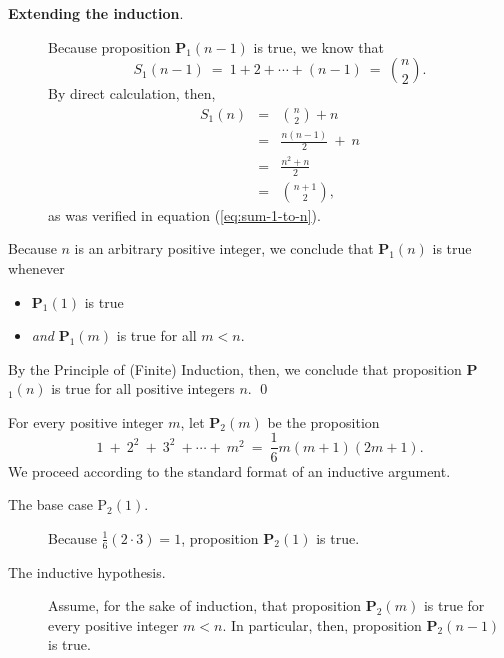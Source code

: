 {\begin{description}
\item[{\bf Extending the induction}.]
%
Because proposition {\bf P}$_1(n-1)$ is true, we know that
\[ S_1(n-1) \ = \ 1 + 2 + \cdots + (n-1) \ = \ {n \choose 2}.  \]
By direct calculation, then,
\begin{eqnarray*}
S_1(n) & = & {n \choose 2} + n \\
  & = & \frac{n(n-1)}{2}  \ + \ n \\ 
  & = & \frac{n^2 + n}{2} \\
  & = & {{n+1} \choose 2},
\end{eqnarray*}
as was verified in equation (\ref{eq:sum-1-to-n}).
\end{description}
Because $n$ is an arbitrary positive integer, we conclude that
{\bf P}$_1(n)$ is true whenever
\begin{itemize}
\item
{\bf P}$_1(1)$ is true
\item
{\em and}
{\bf P}$_1(m)$ is true for all $m < n$.
\end{itemize}
By the Principle of (Finite) Induction, then, we conclude that
proposition {\bf P}$_1(n)$ is true for all positive integers $n$.
\qed

\bigskip


%
For every positive integer $m$, let {\bf P}$_2(m)$ be the proposition
\[  1 \ + \ 2^2 \ + \ 3^2 \ + \cdots + \ m^2 \ = \ 
\frac{1}{6} m (m+1)(2m+1).
\]
We proceed according to the standard format of an inductive argument.

\begin{description}
\item[{\sf The base case P$_2(1)$}.]
%
Because ${\displaystyle \frac{1}{6} (2 \cdot 3)} = 1$, proposition {\bf
    P}$_2(1)$ is true.

\item[{\sf The inductive hypothesis}.]
%
Assume, for the sake of induction, that proposition {\bf P}$_2(m)$ is
true for every positive integer $m < n$.  In particular, then,
proposition {\bf P}$_2(n-1)$ is true.


\end{description}}
